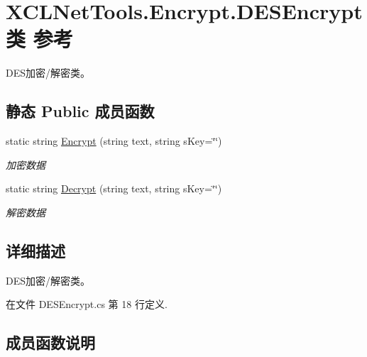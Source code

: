 \hypertarget{class_x_c_l_net_tools_1_1_encrypt_1_1_d_e_s_encrypt}{}\section{X\+C\+L\+Net\+Tools.\+Encrypt.\+D\+E\+S\+Encrypt类 参考}
\label{class_x_c_l_net_tools_1_1_encrypt_1_1_d_e_s_encrypt}


D\+E\+S加密/解密类。  


\subsection*{静态 Public 成员函数}
\begin{DoxyCompactItemize}
\item 
static string \hyperlink{class_x_c_l_net_tools_1_1_encrypt_1_1_d_e_s_encrypt_a5bd946e26e2f43cc6b2d999df6b9d88d}{Encrypt} (string text, string s\+Key=\char`\"{}\char`\"{})
\begin{DoxyCompactList}\small\item\em 加密数据 \end{DoxyCompactList}\item 
static string \hyperlink{class_x_c_l_net_tools_1_1_encrypt_1_1_d_e_s_encrypt_a2455ab42f563bee03bf39c6f6eb9b2d1}{Decrypt} (string text, string s\+Key=\char`\"{}\char`\"{})
\begin{DoxyCompactList}\small\item\em 解密数据 \end{DoxyCompactList}\end{DoxyCompactItemize}


\subsection{详细描述}
D\+E\+S加密/解密类。 



在文件 D\+E\+S\+Encrypt.\+cs 第 18 行定义.



\subsection{成员函数说明}
